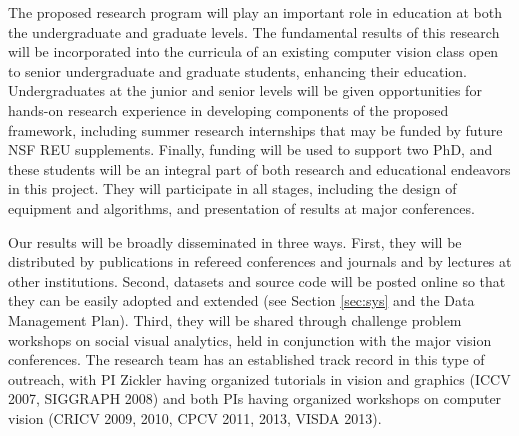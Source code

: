 The proposed research program will play an important role in education at both the undergraduate and graduate levels. The fundamental results of this research will be incorporated into the curricula of an existing computer vision class open to senior undergraduate and graduate students, enhancing their education. Undergraduates at the junior and senior levels will be given opportunities for hands-on research experience in developing components of the proposed framework, including summer research internships that may be funded by future NSF REU supplements. Finally, funding will be used to support two PhD, and these students will be an integral part of both research and educational endeavors in this project. They will participate in all stages, including the design of equipment and algorithms, and presentation of results at major conferences.

Our results will be broadly disseminated in three ways. First, they will be distributed by publications in refereed conferences and journals and by lectures at other institutions.  Second, datasets and source code will be posted online so that they can be easily adopted and extended (see Section \ref{sec:sys} and the Data Management Plan). Third, they will be shared through challenge problem workshops on social visual analytics, held in conjunction with the major vision conferences. The research team has an established track record in this type of outreach, with PI Zickler having organized tutorials in vision and  graphics (ICCV 2007, SIGGRAPH 2008) and both PIs having organized workshops on computer vision (CRICV 2009, 2010, CPCV 2011, 2013, VISDA 2013).
